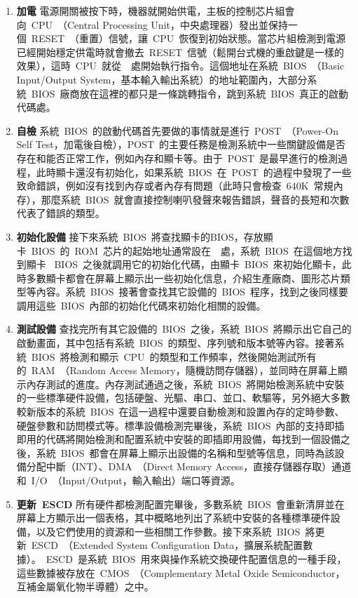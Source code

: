 \begin{enumerate}
\item{\textbf{加電}} 電源開關被按下時，機器就開始供電，主板的控制芯片組會向~CPU~（Central Processing Unit，中央處理器）發出並保持一個~RESET~（重置）信號，讓~CPU~恢復到初始狀態。當芯片組檢測到電源已經開始穩定供電時就會撤去~RESET~信號（鬆開台式機的重啟鍵是一樣的效果），這時~CPU~就從~~處開始執行指令。這個地址在系統~BIOS~（Basic Input/Output System，基本輸入輸出系統）的地址範圍內，大部分系統~BIOS~廠商放在這裡的都只是一條跳轉指令，跳到系統~BIOS~真正的啟動代碼處。

\item{\textbf{自檢}} 系統~BIOS~的啟動代碼首先要做的事情就是進行~POST~（Power-On Self Test，加電後自檢），POST~的主要任務是檢測系統中一些關鍵設備是否存在和能否正常工作，例如內存和顯卡等。由于~POST~是最早進行的檢測過程，此時顯卡還沒有初始化，如果系統~BIOS~在~POST~的過程中發現了一些致命錯誤，例如沒有找到內存或者內存有問題（此時只會檢查~640K~常規內存），那麼系統~BIOS~就會直接控制喇叭發聲來報告錯誤，聲音的長短和次數代表了錯誤的類型。

\item{\textbf{初始化設備}} 接下來系統~BIOS~將查找顯卡的BIOS，存放顯卡~BIOS~的~ROM~芯片的起始地址通常設在~~處，系統~BIOS~在這個地方找到顯卡 ~BIOS~之後就調用它的初始化代碼，由顯卡~BIOS~來初始化顯卡，此時多數顯卡都會在屏幕上顯示出一些初始化信息，介紹生產廠商、圖形芯片類型等內容。系統~BIOS~接著會查找其它設備的~BIOS~程序，找到之後同樣要調用這些~BIOS~內部的初始化代碼來初始化相關的設備。

\item{\textbf{測試設備}} 查找完所有其它設備的~BIOS~之後，系統~BIOS~將顯示出它自己的啟動畫面，其中包括有系統~BIOS~的類型、序列號和版本號等內容。接著系統~BIOS~將檢測和顯示~CPU~的類型和工作頻率，然後開始測試所有的~RAM~（Random Access Memory，隨機訪問存儲器），並同時在屏幕上顯示內存測試的進度。內存測試通過之後，系統~BIOS~將開始檢測系統中安裝的一些標準硬件設備，包括硬盤、光驅、串口、並口、軟驅等，另外絕大多數較新版本的系統~BIOS~在這一過程中還要自動檢測和設置內存的定時參數、硬盤參數和訪問模式等。標準設備檢測完畢後，系統~BIOS~內部的支持即插即用的代碼將開始檢測和配置系統中安裝的即插即用設備，每找到一個設備之後，系統~BIOS~都會在屏幕上顯示出設備的名稱和型號等信息，同時為該設備分配中斷（INT）、DMA~（Direct Memory Access，直接存儲器存取）通道和~I/O~（Input/Output，輸入輸出）端口等資源。

\item{\textbf{更新~ESCD}} 所有硬件都檢測配置完畢後，多數系統~BIOS~會重新清屏並在屏幕上方顯示出一個表格，其中概略地列出了系統中安裝的各種標準硬件設備，以及它們使用的資源和一些相關工作參數。接下來系統~BIOS~將更新~ESCD~（Extended System Configuration Data，擴展系統配置數據）。~ESCD~是系統~BIOS~用來與操作系統交換硬件配置信息的一種手段，這些數據被存放在~CMOS~（Complementary Metal Oxide Semiconductor，互補金屬氧化物半導體）之中。


\end{enumerate}
